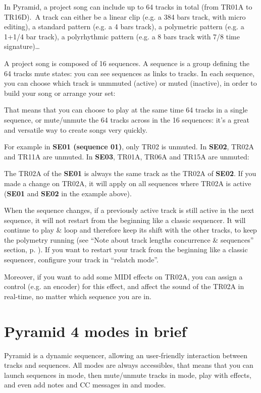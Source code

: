 In Pyramid, a project song can include up to 64 tracks in total (from TR01A to TR16D). A track can either be a linear clip (e.g. a 384 bars track, with micro editing), a standard pattern (e.g. a 4 bars track), a polymetric pattern (e.g. a 1+1/4 bar track), a polyrhythmic pattern (e.g. a 8 bars track with 7/8 time signature)…

A project song is composed of 16 sequences. A sequence is a group defining the 64 tracks mute states: you can see sequences as links to tracks. In each sequence, you can choose which track is unmmuted (active) or muted (inactive), in order to build your song or arrange your set:


That means that you can choose to play at the same time 64 tracks in a single sequence, or mute/unmute the 64 tracks across in the 16 sequences: it's a great and versatile way to create songs very quickly.

For example in \textbf{SE01 (sequence 01)}, only TR02 is unmuted. In \textbf{SE02}, TR02A and TR11A are unmuted. In \textbf{SE03}, TR01A, TR06A and TR15A are unmuted:


The TR02A of the \textbf{SE01} is always the same track as the TR02A of \textbf{SE02}. If you made a change on TR02A, it will apply on all sequences where TR02A is active (\textbf{SE01} and \textbf{SE02} in the example above).

When the sequence changes, if a previously active track is still active in the next sequence, it will not restart from the beginning like a classic sequencer. It will continue to play \& loop and therefore keep its shift with the other tracks, to keep the polymetry running (see ``Note about track lengths concurrence \& sequences'' section, p. \pageref{sec:note-track-len-seq}). If you want to restart your track from the beginning like a classic sequencer, configure your track in ``relatch mode''.

Moreover, if you want to add some MIDI effects on TR02A, you can assign a control (e.g. an encoder) for this effect, and affect the sound of the TR02A in real-time, no matter which sequence you are in.


\section{Pyramid 4 modes in brief}

Pyramid is a dynamic sequencer, allowing an user-friendly interaction between tracks and sequences. All modes are always accessibles, that means that you can launch sequences in  mode, then mute/unmute tracks in  mode, play with effects, and even add notes and CC messages in  and   modes.

